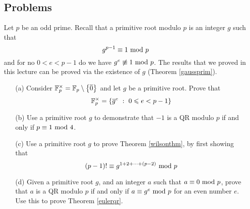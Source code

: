 \vspace*{0.5in}

\subsection{Problems}
\vspace{0.1in}

\begin{problem}\label{Problem 16.1}
Let $p$ be an odd prime. Recall that a primitive root modulo $p$ is an integer $g$ such that \[g^{p-1} \equiv 1 \text{ mod }{p}\] and for no $0 < e < p-1$ do we have $g^e \not\equiv 1 \text{ mod }{p}$. The results that we proved in this lecture can be proved via the existence of $g$ (Theorem \ref{gaussprim}).
\begin{itemize}
\item[(a)] Consider $\mathbb F_p^\times = \mathbb F_p \setminus \left\{\overline{0}\right\}$ and let $g$ be a primitive root. Prove that 
\[\mathbb F_p^\times = \left\{\overline{g}^e\ :\ 0 \leqslant e < p-1\right\}\]
\item[(b)] Use a primitive root $g$ to demonstrate that $-1$ is a QR modulo $p$ if and only if $p \equiv 1 \text{ mod }{4}$.
\item[(c)] Use a primitive root $g$ to prove Theorem \ref{wilsonthm}, by first showing that
\[(p-1)! \equiv g^{1+2+\cdots+(p-2)}\text{ mod }{p}\]
\item[(d)] Given a primitive root $g$, and an integer $a$ such that $a \equiv 0 \text{ mod }{p}$, prove that $a$ is a QR modulo $p$ if and only if $a \equiv g^e \text{ mod }{p}$ for an even number $e$. Use this to prove Theorem \ref{eulerqr}.
\end{itemize} 
\end{problem}